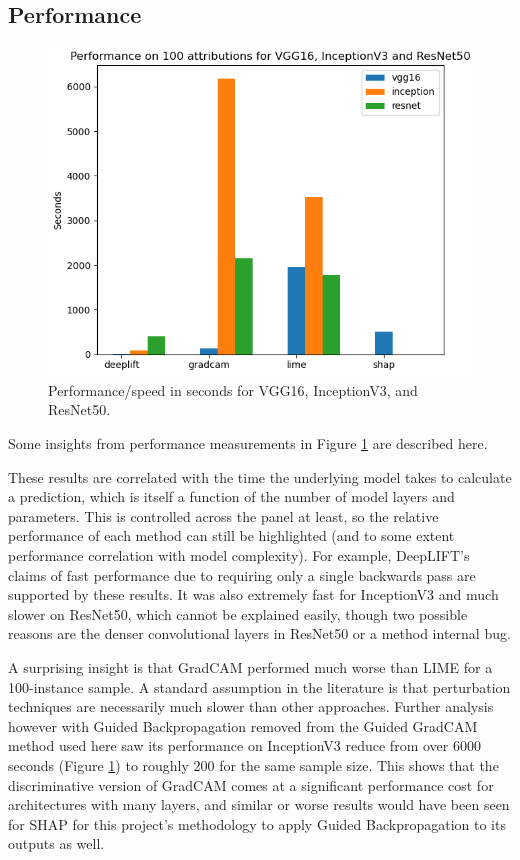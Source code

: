\documentclass[main]{subfiles}
\begin{document}
\subsection{Performance} \label{sec:perform}


\begin{figure}[h]\centering
\vfill
\includegraphics[scale=0.6]{performance.png}
\caption{Performance/speed in seconds for VGG16, InceptionV3, and ResNet50. }
\label{performFig}
\vfill
\end{figure}

\noindent Some insights from performance measurements in Figure \ref{performFig} are described here.

These results are correlated with the time the underlying model takes to calculate a prediction, which is itself a function of the number of model layers and parameters. This is controlled across the panel at least, so the relative performance of each method can still be highlighted (and to some extent performance correlation with model complexity). For example, DeepLIFT's claims of fast performance due to requiring only a single backwards pass are supported by these results. It was also extremely fast for InceptionV3 and much slower on ResNet50, which cannot be explained easily, though two possible reasons are the denser convolutional layers in ResNet50 or a method internal bug.

A surprising insight is that GradCAM performed much worse than LIME for a 100-instance sample. A standard assumption in the literature is that perturbation techniques are necessarily much slower than other approaches. Further analysis however with Guided Backpropagation removed from the Guided GradCAM method used here saw its performance on InceptionV3 reduce from over 6000 seconds (Figure \ref{performFig}) to roughly 200 for the same sample size. This shows that the discriminative version of GradCAM comes at a significant performance cost for architectures with many layers, and similar or worse results would have been seen for SHAP for this project's methodology to apply Guided Backpropagation to its outputs as well.
\end{document}
